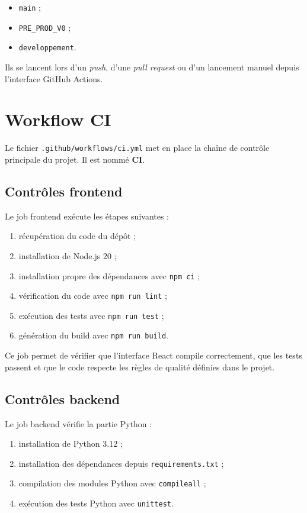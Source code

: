 \documentclass[11pt,a4paper]{article}
\begin{document}
\begin{itemize}
  \item \texttt{main} ;
  \item \texttt{PRE\_PROD\_V0} ;
  \item \texttt{developpement}.
\end{itemize}

Ils se lancent lors d'un \textit{push}, d'une \textit{pull request} ou d'un
lancement manuel depuis l'interface GitHub Actions.

\section{Workflow CI}

Le fichier \texttt{.github/workflows/ci.yml} met en place la chaîne de contrôle
principale du projet. Il est nommé \textbf{CI}.

\subsection{Contrôles frontend}

Le job frontend exécute les étapes suivantes :

\begin{enumerate}
  \item récupération du code du dépôt ;
  \item installation de Node.js 20 ;
  \item installation propre des dépendances avec \texttt{npm ci} ;
  \item vérification du code avec \texttt{npm run lint} ;
  \item exécution des tests avec \texttt{npm run test} ;
  \item génération du build avec \texttt{npm run build}.
\end{enumerate}

Ce job permet de vérifier que l'interface React compile correctement, que les
tests passent et que le code respecte les règles de qualité définies dans le
projet.

\subsection{Contrôles backend}

Le job backend vérifie la partie Python :

\begin{enumerate}
  \item installation de Python 3.12 ;
  \item installation des dépendances depuis \texttt{requirements.txt} ;
  \item compilation des modules Python avec \texttt{compileall} ;
  \item exécution des tests Python avec \texttt{unittest}.
\end{enumerate}
\end{document}
